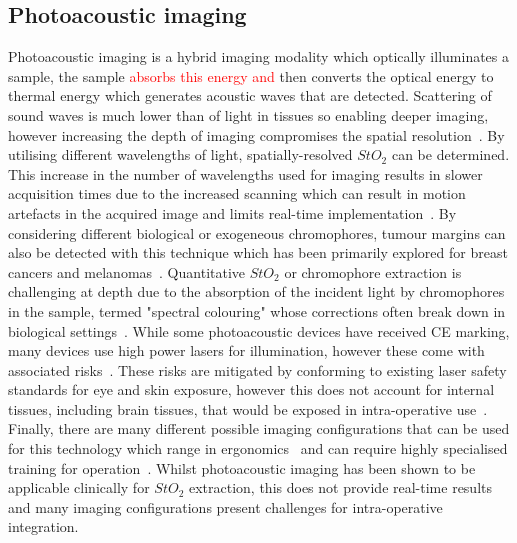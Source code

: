 \subsection{Photoacoustic imaging}
Photoacoustic imaging is a hybrid imaging modality which optically illuminates a sample, the sample \textcolor{red}{absorbs this energy and} then converts the optical energy to thermal energy which generates acoustic waves that are detected. Scattering of sound waves is much lower than of light in tissues so enabling deeper imaging, however increasing the depth of imaging compromises the spatial resolution~\citep{Assi2023}. By utilising different wavelengths of light, spatially-resolved $StO_2$ can be determined. This increase in the number of wavelengths used for imaging results in slower acquisition times due to the increased scanning which can result in motion artefacts in the acquired image and limits real-time implementation~\citep{Assi2023, Attia2019}. By considering different biological or exogeneous chromophores, tumour margins can also be detected with this technique which has been primarily explored for breast cancers and melanomas~\citep{Assi2023, Attia2019, Taylor-Williams2022}. Quantitative $StO_2$ or chromophore extraction is challenging at depth due to the absorption of the incident light by chromophores in the sample, termed "spectral colouring" whose corrections often break down in biological settings~\citep{Assi2023, Taylor-Williams2022}. While some photoacoustic devices have received CE marking, many devices use high power lasers for illumination, however these come with associated risks~\citep{Assi2023}. These risks are mitigated by conforming to existing laser safety standards for eye and skin exposure, however this does not account for internal tissues, including brain tissues, that would be exposed in intra-operative use~\citep{Assi2023}. Finally, there are many different possible imaging configurations that can be used for this technology which range in ergonomics~\citep{Attia2019} and can require highly specialised training for operation~\citep{Assi2023}. Whilst photoacoustic imaging has been shown to be applicable clinically for $StO_2$ extraction, this does not provide  real-time results and many imaging configurations present challenges for intra-operative integration. 

